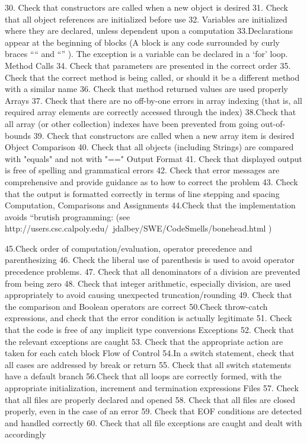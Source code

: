 30. Check that constructors are called when a new object is desired
31. Check that all object references are initialized before use
32. Variables are initialized where they are declared, unless dependent upon
a computation
33.Declarations appear at the beginning of blocks (A block is any code
surrounded by curly braces “{“ and “}” ). The exception is a variable can be declared in a ‘for’ loop.
Method Calls
34. Check that parameters are presented in the correct order
35. Check that the correct method is being called, or should it be a different
method with a similar name
36. Check that method returned values are used properly
Arrays
37. Check that there are no off-by-one errors in array indexing (that is, all required array elements are correctly accessed through the index)
38.Check that all array (or other collection) indexes have been prevented from going out-of-bounds
39. Check that constructors are called when a new array item is desired
Object Comparison
40. Check that all objects (including Strings) are compared with "equals" and not with "=="
Output Format
41. Check that displayed output is free of spelling and grammatical errors
42. Check that error messages are comprehensive and provide guidance as to
how to correct the problem
43. Check that the output is formatted correctly in terms of line stepping and
spacing
Computation, Comparisons and Assignments
44.Check that the implementation avoids “brutish programming: (see http://users.csc.calpoly.edu/~jdalbey/SWE/CodeSmells/bonehead.html )
 
45.Check order of computation/evaluation, operator precedence and parenthesizing
46. Check the liberal use of parenthesis is used to avoid operator precedence problems.
47. Check that all denominators of a division are prevented from being zero
48. Check that integer arithmetic, especially division, are used appropriately
to avoid causing unexpected truncation/rounding
49. Check that the comparison and Boolean operators are correct
50.Check throw-catch expressions, and check that the error condition is
actually legitimate
51. Check that the code is free of any implicit type conversions
Exceptions
52. Check that the relevant exceptions are caught
53. Check that the appropriate action are taken for each catch block
Flow of Control
54.In a switch statement, check that all cases are addressed by break or return
55. Check that all switch statements have a default branch
56.Check that all loops are correctly formed, with the appropriate
initialization, increment and termination expressions
Files
57. Check that all files are properly declared and opened
58. Check that all files are closed properly, even in the case of an error
59. Check that EOF conditions are detected and handled correctly
60. Check that all file exceptions are caught and dealt with accordingly


